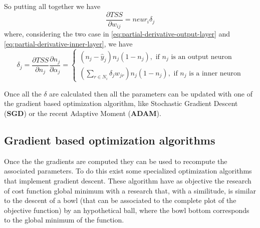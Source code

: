 So putting all together we have 
\begin{equation}
	\frac{\partial{TSS}}{\partial{w_{ij}}} = neur_i\delta_j
\end{equation}
where, considering the two case in \ref{eq:partial-derivative-output-layer} and \ref{eq:partial-derivative-inner-layer}, we have
\begin{equation}
	\delta_j = \frac{\partial{TSS}}{\partial{n_j}}\frac{\partial{n_j}}{\partial{\alpha_j}} = \left.
	\begin{cases}
		(n_j - \hat{y}_j)n_j(1 - n_j),\textrm{ if } n_j \textrm{ is an output neuron} \\
(\sum\limits_{r	\in N_i}\delta_{j}w_{jr})n_{j}(1 - n_{j}), \textrm{ if }n_j\textrm{ is a inner neuron}
	\end{cases}\right.
\end{equation}

Once all the $\delta$ are calculated then all the parameters can be updated with one of the gradient based optimization algorithm, like Stochastic Gradient Descent (\textbf{SGD}) or the recent Adaptive Moment (\textbf{ADAM}).


\subsection{Gradient based optimization algorithms}
Once the the gradients are computed they can be used to recompute the associated parameters. To do this exist some specialized optimization algorithms that implement gradient descent. These algorithm have as objective the research of cost function global minimum with a research that, with a similitude, is similar to the descent of a bowl (that can be associated to the complete plot of the objective function) by an hypothetical ball, where the bowl bottom corresponds to the global minimum of the function.

